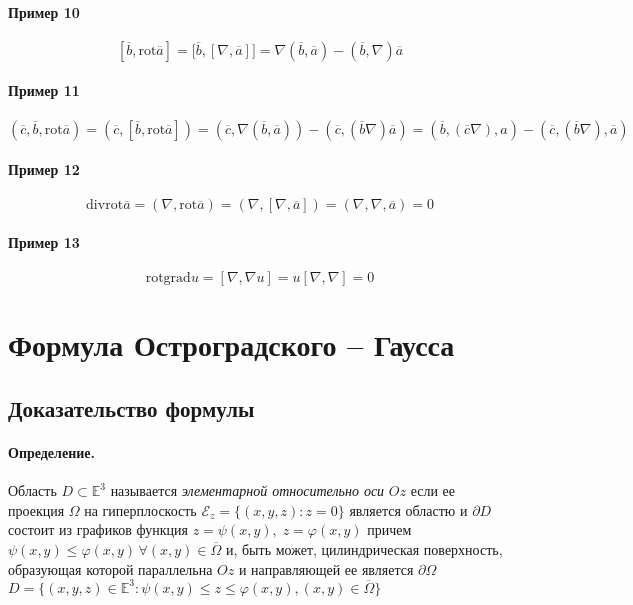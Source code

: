\documentclass{letnab}
\begin{document}
\paragraph{Пример 10}
\[
[\overline{b}, \mathrm{rot} \overline{a}] = \bigl[\overline{b},[\nabla, \overline{a}]\bigr] = \nabla (\overline{b},\overline{a}) - (\overline{b},\nabla)\overline{a}
\]
\paragraph{Пример 11}
\[
(\overline{c}, \overline{b}, \mathrm{rot}\overline{a}) = (\overline{c}, [\overline{b},\mathrm{rot} \overline{a}]) = (\overline{c}, \nabla (\overline{b},\overline{a})) - (\overline{c},(\overline{b}\nabla)\overline{a}) =(\overline{b},(\overline{c}\nabla),a) - (\overline{c},(\overline{b}\nabla),\overline{a})
\]
\paragraph{Пример 12}
\[
\mathrm{div} \mathrm{rot} \overline{a} = (\nabla, \mathrm{rot}\overline{a}) = (\nabla, [\nabla, \overline{a}]) = (\nabla, \nabla, \overline{a}) = 0
\]
\paragraph{Пример 13}
\[
\mathrm{rot} \mathrm{grad} u = [\nabla, \nabla u] = u [\nabla, \nabla] = 0
\]
\section {Формула Остроградского -- Гаусса}
\subsection{Доказательство формулы}
\paragraph{Определение.} Область $ D \subset \mathbb{E}^3 $ называется \textit{элементарной относительно оси} $ Oz $ если ее проекция $ \Omega $ на гиперплоскость $ \mathcal{E}_z = \{ (x,y,z): z= 0 \} $ является областю и $ \partial D $ состоит из графиков функция $ z=\psi(x,y),\;z=\varphi(x,y) $ причем $ \psi(x,y)\leqslant \varphi(x,y)\, \forall(x,y) \in \overline{\Omega} $ и, быть может, цилиндрическая поверхность, образующая которой параллельна $ Oz $ и направляющей ее является $ \partial\Omega $ \\
$ D = \{ (x,y,z)\in\mathbb{E}^3:\psi(x,y)\leqslant z \leqslant \varphi(x,y), (x,y) \in \overline{\Omega} \} $
\end{document}
